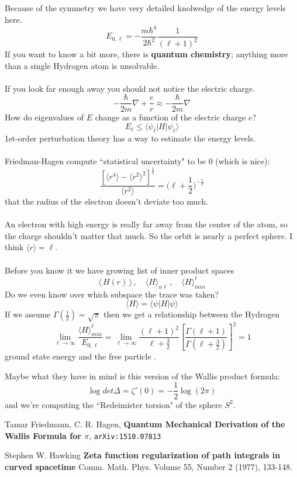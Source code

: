 \documentclass[12pt]{article}
\begin{document}
\noindent Because of the symmetry we have very detailed knolwedge of the energy levels here.
$$ E_{0, \ell } = - \frac{m \hbar^4}{2 \hbar^2} \frac{1}{(\ell + 1)^2} $$
If you want to know a bit more, there is \textbf{quantum chemistry}; anything more than a single Hydrogen atom is unsolvable. \\ \\
If you look far enough away you should not notice the electric charge.
$$  - \frac{\hbar}{2m}\nabla  + \frac{e}{r}  \approx  - \frac{\hbar}{2m}\nabla  $$
How do eigenvalues of $E$ change as a function of the electric charge $e$? 
$$ E_\ell  \leq \langle \psi_\ell | H | \psi_\ell \rangle  $$
1st-order perturbation theory has a way to estimate the energy levels. \\ \\
Friedman-Hagen compute ``statistical uncertainty" to be $0$ (which is nice):
$$ \frac{ [\langle r^4 \rangle - \langle r^2 \rangle^2 ]^{\frac{1}{2}} }{\langle r^2 \rangle} = \Big(\ell + \frac{1}{2}\Big)^{-\frac{1}{2}}$$
that the radius of the electron doesn't deviate too much.  \\ \\
An electron with high energy is really far away from the center of the atom, so the charge shouldn't matter that much.  So the orbit is nearly a perfect sphere.  I think $\langle r \rangle = \ell$. \\\\
Before you know it we have growing list of inner product spaces
$$ \langle \,H(r)\, \rangle\,, \quad \langle H \rangle_{\alpha\ell}\,, \quad \langle H \rangle_{min}^\ell $$
Do we even know over which subspace the trace was taken? 
$$ \langle H \rangle = \langle \psi | H | \psi \rangle $$
If we assume $\Gamma(\frac{1}{2}) = \sqrt{\pi}$ then we get a relationship between the Hydrogen 
$$ \lim_{\ell \to \infty} \frac{\langle H \rangle_{min}^\ell }{ E_{0, \ell}} 
= \lim_{\ell \to \infty}  \frac{(\ell+1)^2}{\ell + \frac{3}{2} }\left[ \frac{ \Gamma (\ell + 1) }{   \Gamma (\ell + \frac{3}{2} ) }\right]^2 = 1$$
ground state energy and the free particle .

\newpage

\noindent Maybe what they have in mind is this version of the Wallis product formula:
$$ \log det \Delta = \zeta'(0) = - \frac{1}{2} \log (2\pi)  $$
and we're computing the ``Redeimister torsion" of the sphere $S^2$.

\vfill

\begin{thebibliography}{}

\item Tamar Friedmann, C. R. Hagen, \textbf{Quantum Mechanical Derivation of the Wallis Formula for $\pi$}, \texttt{arXiv:1510.07813}

\item Stephen W. Hawking \textbf{Zeta function regularization of path integrals in curved spacetime} Comm. Math. Phys.
Volume 55, Number 2 (1977), 133-148.


\end{thebibliography}
\end{document}
